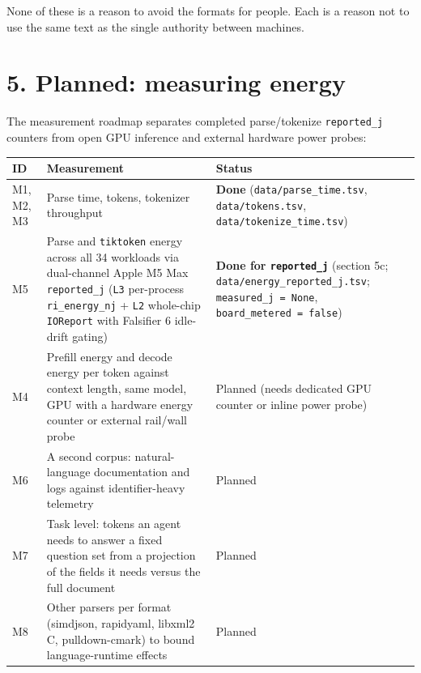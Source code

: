 \documentclass[10pt,letterpaper]{article}
\newcounter{none}
\begin{document}
None of these is a reason to avoid the formats for people. Each is a
reason not to use the same text as the single authority between
machines.

\section{5. Planned: measuring energy}\label{planned-measuring-energy}

The measurement roadmap separates completed parse/tokenize
\texttt{reported\_j} counters from open GPU inference and external
hardware power probes:

{\def\LTcaptype{none} %
{\footnotesize\setlength{\tabcolsep}{3.8pt}\renewcommand{\arraystretch}{1.15}
\begin{longtable}[]{@{}
  >{\raggedright\arraybackslash}p{}
  >{\raggedright\arraybackslash}p{}
  >{\raggedright\arraybackslash}p{}@{}}
\toprule\noalign{}
\begin{minipage}[b]{\linewidth}\raggedright
\textbf{ID}
\end{minipage} & \begin{minipage}[b]{\linewidth}\raggedright
\textbf{Measurement}
\end{minipage} & \begin{minipage}[b]{\linewidth}\raggedright
\textbf{Status}
\end{minipage} \\
\midrule\noalign{}
\endhead
\bottomrule\noalign{}
\endlastfoot
M1, M2, M3 & Parse time, tokens, tokenizer throughput & \textbf{Done}
(\texttt{data/\allowbreak{}parse\_\allowbreak{}time.\allowbreak{}tsv}, \texttt{data/tokens.tsv},
\texttt{data/\allowbreak{}tokenize\_\allowbreak{}time.\allowbreak{}tsv}) \\
M5 & Parse and \texttt{tiktoken} energy across all 34 workloads via
dual-channel Apple M5 Max \texttt{reported\_j} (\texttt{L3} per-process
\texttt{ri\_energy\_nj} + \texttt{L2} whole-chip \texttt{IOReport} with
Falsifier 6 idle-drift gating) & \textbf{Done for \texttt{reported\_j}}
(section 5c; \texttt{data/\allowbreak{}energy\_\allowbreak{}reported\_\allowbreak{}j.\allowbreak{}tsv};
\texttt{measured\_\allowbreak{}j\ =\ None}, \texttt{board\_\allowbreak{}metered\ =\ false}) \\
M4 & Prefill energy and decode energy per token against context length,
same model, GPU with a hardware energy counter or external rail/wall
probe & Planned (needs dedicated GPU counter or inline power probe) \\
M6 & A second corpus: natural-language documentation and logs against
identifier-heavy telemetry & Planned \\
M7 & Task level: tokens an agent needs to answer a fixed question set
from a projection of the fields it needs versus the full document &
Planned \\
M8 & Other parsers per format (simdjson, rapidyaml, libxml2 C,
pulldown-cmark) to bound language-runtime effects & Planned \\
\end{longtable}
}
}
\end{document}
